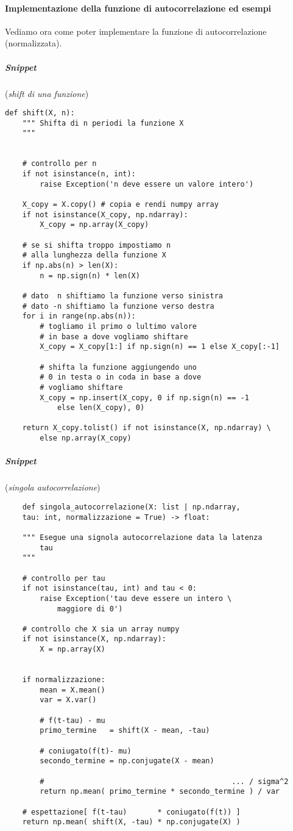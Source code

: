 \paragraph{Implementazione della funzione di autocorrelazione ed esempi}
Vediamo ora come poter implementare la funzione di autocorrelazione (normalizzata).
\subparagraph*{Snippet} (\textit{shift di una funzione})
\begin{verbatim}
def shift(X, n):
    """ Shifta di n periodi la funzione X
    """


    # controllo per n
    if not isinstance(n, int):
        raise Exception('n deve essere un valore intero')

    X_copy = X.copy() # copia e rendi numpy array
    if not isinstance(X_copy, np.ndarray):
        X_copy = np.array(X_copy)

    # se si shifta troppo impostiamo n
    # alla lunghezza della funzione X
    if np.abs(n) > len(X):
        n = np.sign(n) * len(X)
    
    # dato  n shiftiamo la funzione verso sinistra
    # dato -n shiftiamo la funzione verso destra
    for i in range(np.abs(n)):
        # togliamo il primo o lultimo valore
        # in base a dove vogliamo shiftare
        X_copy = X_copy[1:] if np.sign(n) == 1 else X_copy[:-1]

        # shifta la funzione aggiungendo uno 
        # 0 in testa o in coda in base a dove
        # vogliamo shiftare
        X_copy = np.insert(X_copy, 0 if np.sign(n) == -1 
            else len(X_copy), 0)

    return X_copy.tolist() if not isinstance(X, np.ndarray) \
        else np.array(X_copy)
\end{verbatim}

\subparagraph*{Snippet} (\textit{singola autocorrelazione})
\begin{verbatim}
    def singola_autocorrelazione(X: list | np.ndarray, 
    tau: int, normalizzazione = True) -> float:

    """ Esegue una signola autocorrelazione data la latenza
        tau
    """

    # controllo per tau
    if not isinstance(tau, int) and tau < 0:
        raise Exception('tau deve essere un intero \
            maggiore di 0')

    # controllo che X sia un array numpy
    if not isinstance(X, np.ndarray):
        X = np.array(X)


    if normalizzazione:
        mean = X.mean()
        var = X.var()
        
        # f(t-tau) - mu
        primo_termine   = shift(X - mean, -tau)

        # coniugato(f(t)- mu)
        secondo_termine = np.conjugate(X - mean)

        #                                           ... / sigma^2
        return np.mean( primo_termine * secondo_termine ) / var

    # espettazione[ f(t-tau)       * coniugato(f(t)) ]   
    return np.mean( shift(X, -tau) * np.conjugate(X) )
\end{verbatim}

